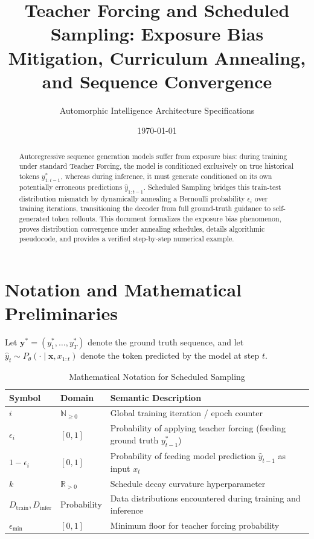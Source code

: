 \documentclass[11pt,a4paper]{article}
\title{Teacher Forcing and Scheduled Sampling: Exposure Bias Mitigation, Curriculum Annealing, and Sequence Convergence}
\author{Automorphic Intelligence Architecture Specifications}
\date{\today}
\theoremstyle{definition}
\begin{document}
\maketitle

\begin{abstract}
Autoregressive sequence generation models suffer from exposure bias: during training under standard Teacher Forcing, the model is conditioned exclusively on true historical tokens $y_{1:t-1}^*$, whereas during inference, it must generate conditioned on its own potentially erroneous predictions $\hat{y}_{1:t-1}$. Scheduled Sampling bridges this train-test distribution mismatch by dynamically annealing a Bernoulli probability $\epsilon_i$ over training iterations, transitioning the decoder from full ground-truth guidance to self-generated token rollouts. This document formalizes the exposure bias phenomenon, proves distribution convergence under annealing schedules, details algorithmic pseudocode, and provides a verified step-by-step numerical example.
\end{abstract}

\section{Notation and Mathematical Preliminaries}

Let $\mathbf{y}^* = (y_1^*, \dots, y_T^*)$ denote the ground truth sequence, and let $\hat{y}_t \sim P_\theta(\cdot \mid \mathbf{x}, x_{1:t})$ denote the token predicted by the model at step $t$.

\begin{table}[h]
\centering
\caption{Mathematical Notation for Scheduled Sampling}
\begin{tabular}{lll}
\toprule
\textbf{Symbol} & \textbf{Domain} & \textbf{Semantic Description} \\
\midrule
$i$ & $\mathbb{N}_{\ge 0}$ & Global training iteration / epoch counter \\
$\epsilon_i$ & $[0, 1]$ & Probability of applying teacher forcing (feeding ground truth $y_{t-1}^*$) \\
$1 - \epsilon_i$ & $[0, 1]$ & Probability of feeding model prediction $\hat{y}_{t-1}$ as input $x_t$ \\
$k$ & $\mathbb{R}_{> 0}$ & Schedule decay curvature hyperparameter \\
$D_{\text{train}}, D_{\text{infer}}$ & Probability & Data distributions encountered during training and inference \\
$\epsilon_{\min}$ & $[0, 1]$ & Minimum floor for teacher forcing probability \\
\bottomrule
\end{tabular}
\end{table}
\end{document}
